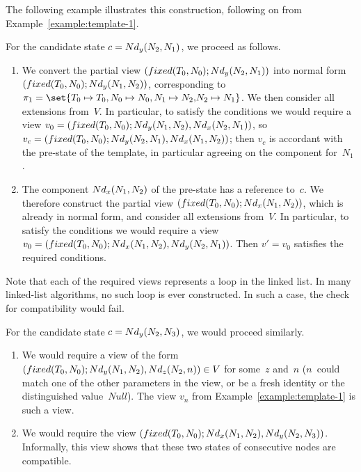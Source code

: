 
The following example illustrates this construction, following on from
Example~\ref{example:template-1}.
%
\begin{example}
For the candidate state $c = Nd_y(N_2,N_1)$, we proceed as follows. 
%
\begin{enumerate}
\item We convert the partial view $(fixed(T_0,N_0); Nd_y(N_2,N_1))$ into
  normal form $(fixed(T_0,N_0); Nd_y(N_1,N_2))$, corresponding to $\pi_1 =
  \set{T_0 \mapsto T_0, N_0 \mapsto N_0, {N_1 \mapsto N_2,}\linebreak[1] N_2
    \mapsto N_1}$.  We  then consider all extensions from~$V$.  In
  particular, to satisfy the conditions we would require a view $v_0 =
  (fixed(T_0,N_0); Nd_y(N_1,N_2), Nd_x(N_2,N_1))$, so $v_c =
  (fixed(T_0,N_0); Nd_y(N_2,N_1), Nd_x(N_1,N_2))$; then $v_c$ is
  accordant with the pre-state of the template, in particular agreeing on the
  component for~$N_1$.

\item The component $Nd_x(N_1,N_2)$ of the pre-state has a reference
  to~$c$.  We therefore construct the partial view $(fixed(T_0,N_0);
  Nd_x(N_1,N_2))$, which is already in normal form, and consider all
  extensions from~$V$.  In particular, to satisfy the conditions we would
  require a view $v_0 = (fixed(T_0,N_0); Nd_x(N_1,N_2),
  Nd_y(N_2,N_1))$.  Then $v' = v_0$ satisfies the required conditions.
\end{enumerate}
%
Note that each of the required views represents a loop in the linked list.  In
many linked-list algorithms, no such loop is ever constructed.  In such a
case, the check for compatibility would fail. 

For the candidate state $c = Nd_y(N_2,N_3)$, we would proceed similarly.
%
\begin{enumerate}
\item We would require a view of the form $(fixed(T_0,N_0); Nd_y(N_1,N_2),
  Nd_z(N_2,n)) \in V$ for some~$z$ and~$n$ ($n$~could match one of the
  other parameters in the view, or be a fresh identity or the distinguished
  value~$Null$).  The view $v_n$ from Example~\ref{example:template-1} is such
  a view.

\item We would require the view $(fixed(T_0,N_0); Nd_x(N_1,N_2),
  Nd_y(N_2,N_3))$.  Informally, this view shows that these two states of
  consecutive nodes are compatible.
\end{enumerate}
\end{example}


